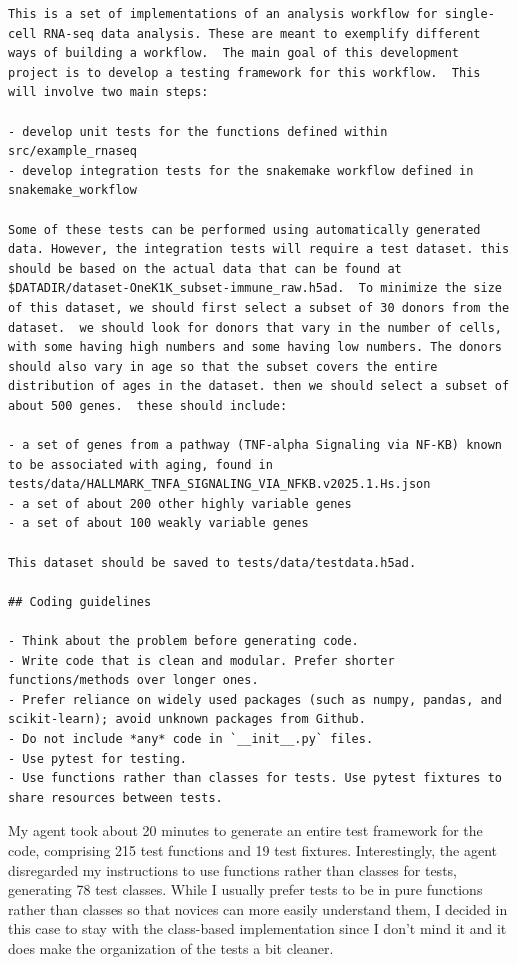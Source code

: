 \begin{lstlisting}[style=transcript]
This is a set of implementations of an analysis workflow for single-cell RNA-seq data analysis. These are meant to exemplify different ways of building a workflow.  The main goal of this development project is to develop a testing framework for this workflow.  This will involve two main steps:

- develop unit tests for the functions defined within src/example_rnaseq
- develop integration tests for the snakemake workflow defined in snakemake_workflow

Some of these tests can be performed using automatically generated data. However, the integration tests will require a test dataset. this should be based on the actual data that can be found at $DATADIR/dataset-OneK1K_subset-immune_raw.h5ad.  To minimize the size of this dataset, we should first select a subset of 30 donors from the dataset.  we should look for donors that vary in the number of cells, with some having high numbers and some having low numbers. The donors should also vary in age so that the subset covers the entire distribution of ages in the dataset. then we should select a subset of about 500 genes.  these should include:

- a set of genes from a pathway (TNF-alpha Signaling via NF-KB) known to be associated with aging, found in tests/data/HALLMARK_TNFA_SIGNALING_VIA_NFKB.v2025.1.Hs.json
- a set of about 200 other highly variable genes
- a set of about 100 weakly variable genes

This dataset should be saved to tests/data/testdata.h5ad.

## Coding guidelines

- Think about the problem before generating code.
- Write code that is clean and modular. Prefer shorter functions/methods over longer ones.
- Prefer reliance on widely used packages (such as numpy, pandas, and scikit-learn); avoid unknown packages from Github.
- Do not include *any* code in `__init__.py` files.
- Use pytest for testing.
- Use functions rather than classes for tests. Use pytest fixtures to share resources between tests.
\end{lstlisting}

My agent took about 20 minutes to generate an entire test framework for the code, comprising 215 test functions and 19 test fixtures.  Interestingly, the agent disregarded my instructions to use functions rather than classes for tests, generating 78 test classes.  While I usually prefer tests to be in pure functions rather than classes so that novices can more easily understand them, I decided in this case to stay with the class-based implementation since I don't mind it and it does make the organization of the tests a bit cleaner.


